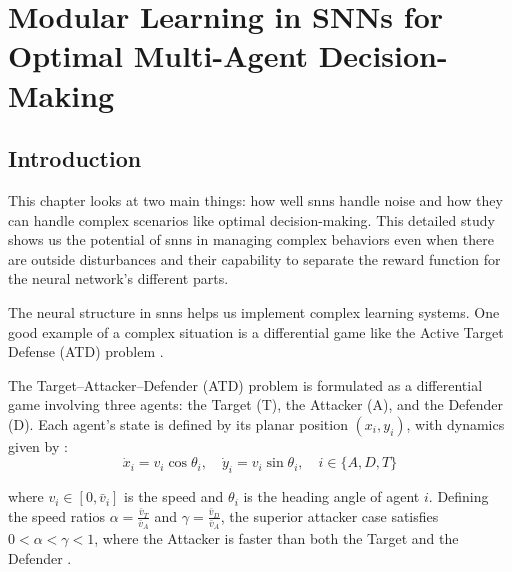 \chapter{Modular Learning in SNNs for Optimal Multi-Agent Decision-Making}

\section{Introduction}

This chapter looks at two main things: how well \ac{snn}s handle noise and how they can handle complex scenarios like optimal decision-making. This detailed study shows us the potential of \ac{snn}s in managing complex behaviors even when there are outside disturbances and their capability to separate the reward function for the neural network's different parts.

The neural structure in \ac{snn}s helps us implement complex learning systems. One good example of a complex situation is a differential game like the Active Target Defense (ATD) problem \cite{Ch5_ATD4}.



The Target--Attacker--Defender (ATD) problem is formulated as a differential game involving three agents: the Target (T), the Attacker (A), and the Defender (D). Each agent's state is defined by its planar position \((x_i, y_i)\), with dynamics given by \cite{Ch5_ATD4-5}:
\begin{equation}
    \dot{x}_i = v_i \cos \theta_i, \quad \dot{y}_i = v_i \sin \theta_i, \quad i \in \{A, D, T\}
\end{equation}

\noindent where \(v_i \in [0, \bar{v}_i]\) is the speed and \(\theta_i\) is the heading angle of agent \(i\). Defining the speed ratios \(\alpha = \frac{\bar{v}_T}{\bar{v}_A}\) and \(\gamma = \frac{\bar{v}_D}{\bar{v}_A}\), the superior attacker case satisfies \(0 < \alpha < \gamma < 1\), where the Attacker is faster than both the Target and the Defender \cite{Ch5_ATD4-5}.

